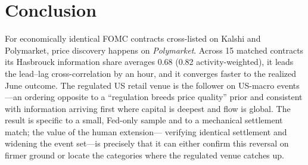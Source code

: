 \documentclass[12pt]{article}
\begin{document}
\section{Conclusion}\label{sec:conc}
For economically identical FOMC contracts cross-listed on Kalshi and Polymarket, price
discovery happens on \emph{Polymarket}. Across 15 matched contracts its Hasbrouck
information share averages 0.68 (0.82 activity-weighted), it leads the lead--lag
cross-correlation by an hour, and it converges faster to the realized June outcome. The
regulated US retail venue is the follower on US-macro events---an ordering opposite to a
``regulation breeds price quality'' prior and consistent with information arriving first
where capital is deepest and flow is global. The result is specific to a small,
Fed-only sample and to a mechanical settlement match; the value of the human extension---
verifying identical settlement and widening the event set---is precisely that it can either
confirm this reversal on firmer ground or locate the categories where the regulated venue
catches up.
\end{document}
